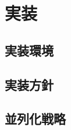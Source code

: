 \chapter{実装}
{
\label{chap:implement}

\section{実装環境}
\label{sec:impl_env}

\section{実装方針}
\label{sec:principle}

\section{並列化戦略}
\label{sec:strategy}
}